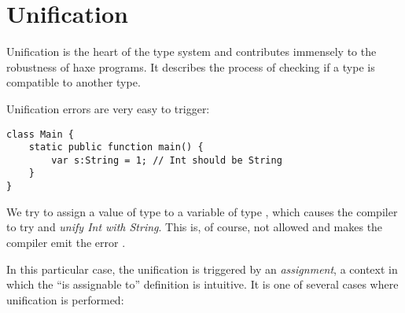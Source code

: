 \documentclass{haxe}
\begin{document}





\section{Unification}
\label{type-system-unification}


Unification is the heart of the type system and contributes immensely to the robustness of haxe programs. It describes the process of checking if a type is compatible to another type.


Unification errors are very easy to trigger:

\begin{lstlisting}
class Main {
	static public function main() {
		var s:String = 1; // Int should be String
	}
}
\end{lstlisting}
We try to assign a value of type  to a variable of type , which causes the compiler to try and \emph{unify Int with String}. This is, of course, not allowed and makes the compiler emit the error .

In this particular case, the unification is triggered by an \emph{assignment}, a context in which the ``is assignable to'' definition is intuitive. It is one of several cases where unification is performed:
\end{document}

